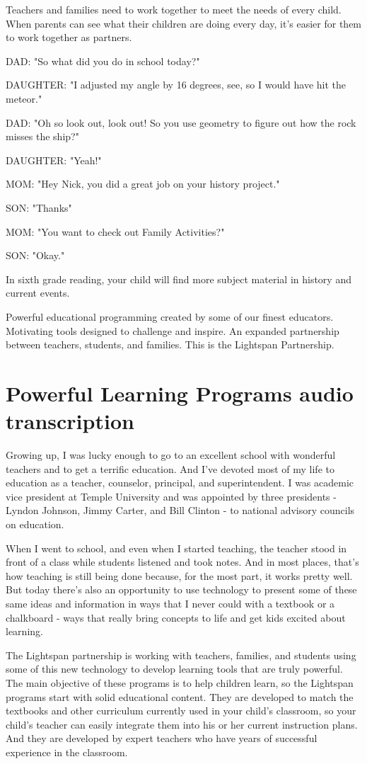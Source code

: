 Teachers and families need to work together to meet the needs of every child.
When parents can see what their children are doing every day, it's easier for them to work together as partners.

DAD: "So what did you do in school today?"

DAUGHTER: "I adjusted my angle by 16 degrees, see, so I would have hit the meteor."

DAD: "Oh so look out, look out! So you use geometry to figure out how the rock misses the ship?"

DAUGHTER: "Yeah!"

MOM: "Hey Nick, you did a great job on your history project."

SON: "Thanks"

MOM: "You want to check out Family Activities?"

SON: "Okay."

In sixth grade reading, your child will find more subject material in history and current events.

Powerful educational programming created by some of our finest educators.
Motivating tools designed to challenge and inspire.
An expanded partnership between teachers, students, and families.
This is the Lightspan Partnership.

\section{Powerful Learning Programs audio transcription}

Growing up, I was lucky enough to go to an excellent school with wonderful teachers and to get a terrific education.
And I've devoted most of my life to education as a teacher, counselor, principal, and superintendent.
I was academic vice president at Temple University and was appointed by three presidents - Lyndon Johnson, Jimmy Carter, and Bill Clinton - to national advisory councils on education.

When I went to school, and even when I started teaching, the teacher stood in front of a class while students listened and took notes.
And in most places, that's how teaching is still being done because, for the most part, it works pretty well.
But today there's also an opportunity to use technology to present some of these same ideas and information in ways that I never could with a textbook or a chalkboard - ways that really bring concepts to life and get kids excited about learning.

The Lightspan partnership is working with teachers, families, and students using some of this new technology to develop learning tools that are truly powerful.
The main objective of these programs is to help children learn, so the Lightspan programs start with solid educational content.
They are developed to match the textbooks and other curriculum currently used in your child's classroom, so your child's teacher can easily integrate them into his or her current instruction plans.
And they are developed by expert teachers who have years of successful experience in the classroom.

